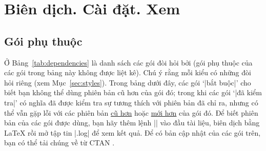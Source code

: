 \section{\texorpdfstring{Biên dịch. Cài đặt}{Bien dich. Cai dat}. Xem}
\label{sec:compiling}


\subsection{\texorpdfstring{Gói phụ thuộc}{Goi phu thuoc}}

\label{sec:dependencies}


Ở Bảng~\vref{tab:dependencies} là danh sách các gói đòi hỏi bởi 
(gói phụ thuộc của các gói trong bảng này không được liệt kê). Chú ý rằng
mỗi kiểu có những đòi hỏi riêng (xem Mục~\vref{sec:styles}). Trong bảng dưới đây,
các gói `|bắt buộc|' cho biết bạn không thể dùng phiên bản cũ hơn của gói đó;
trong khi các gói `|đã kiểm tra|' có nghĩa  đã được kiểm tra
sự tương thích với phiên bản đã chỉ ra, nhưng có thể vẫn gặp lỗi với các
phiên bản \underline{cũ hơn} hoặc \underline{mới hơn} của gói đó.
Để biết phiên bản của các gói được dùng, bạn hãy thêm lệnh |\listfiles|
vào đầu tài liệu, biên dịch bằng \LaTeX{} rồi mở tập tin |.log| để xem
kết quả. Để có bản cập nhật của các gói trên, bạn có thể tải chúng về
từ CTAN \cite{CTAN}.%


